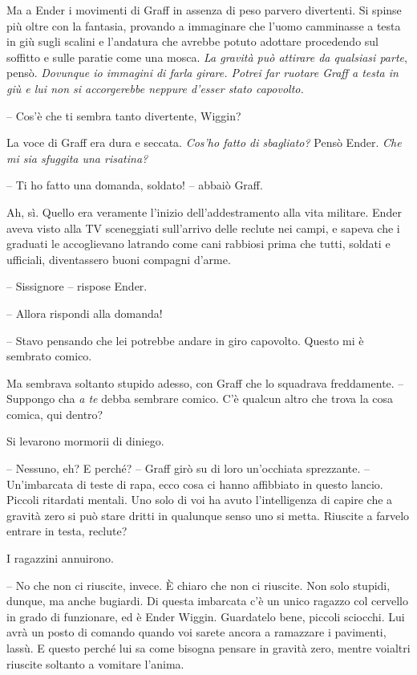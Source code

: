 {Ma a Ender i movimenti di Graff in assenza di peso parvero divertenti.
	Si spinse più oltre con la fantasia, provando a immaginare che l'uomo
	camminasse a testa in giù sugli scalini e l'andatura che avrebbe potuto
	adottare procedendo sul soffitto e sulle paratie come una mosca.
	\emph{La gravità può attirare da qualsiasi parte}, \emph{} pensò.
	\emph{Dovunque io immagini di farla girare. Potrei far ruotare Graff a
		testa in giù e lui non si accorgerebbe neppure d'esser stato
		capovolto.}}

{-- Cos'è che ti sembra tanto divertente, Wiggin?}

{La voce di Graff era dura e seccata. \emph{Cos'ho fatto di sbagliato?}
	Pensò Ender. \emph{Che mi sia sfuggita una risatina?}}

{-- Ti ho fatto una domanda, soldato! -- abbaiò Graff.}

{Ah, sì. Quello era veramente l'inizio dell'addestramento alla vita
	militare. Ender aveva visto alla TV sceneggiati sull'arrivo delle
	reclute nei campi, e sapeva che i graduati le accoglievano latrando come
	cani rabbiosi prima che tutti, soldati e ufficiali, diventassero buoni
	compagni d'arme.}

{-- Sissignore -- rispose Ender.}

{-- Allora rispondi alla domanda!}

{-- Stavo pensando che lei potrebbe andare in giro capovolto. Questo mi
	è sembrato comico.}

{Ma sembrava soltanto stupido adesso, con Graff che lo squadrava
	freddamente. -- Suppongo cha \emph{a te} debba sembrare comico. C'è
	qualcun altro che trova la cosa comica, qui dentro?}

{Si levarono mormorii di diniego.}

{-- Nessuno, eh? E perché? -- Graff girò su di loro un'occhiata
	sprezzante. -- Un'imbarcata di teste di rapa, ecco cosa ci hanno
	affibbiato in questo lancio. Piccoli ritardati mentali. Uno solo di voi
	ha avuto l'intelligenza di capire che a gravità zero si può stare dritti
	in qualunque senso uno si metta. Riuscite a farvelo entrare in testa,
	reclute?}

{I ragazzini annuirono.}

{-- No che non ci riuscite, invece. È chiaro che non ci riuscite. Non
	solo stupidi, dunque, ma anche bugiardi. Di questa imbarcata c'è un
	unico ragazzo col cervello in grado di funzionare, ed è Ender Wiggin.
	Guardatelo bene, piccoli sciocchi. Lui avrà un posto di comando quando
	voi sarete ancora a ramazzare i pavimenti, lassù. E questo perché lui sa
	come bisogna pensare in gravità zero, mentre voialtri riuscite soltanto
	a vomitare l'anima.}


